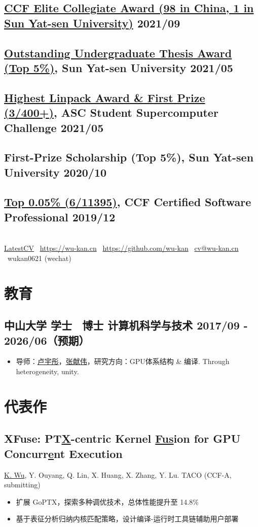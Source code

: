 \documentclass[
    scheme=plain
]{ctexart}
\makeatletter
\newcommand{\datedsubsection}[2]{%
\subsection[#1]{#1 \hfill #2}
}
\renewcommand\maketitle{
\begin{center}
  {\LARGE\textbf{\@title}}\\
  \href{https://resume.wu-kan.cn}{LatestCV}
  \textperiodcentered\
  \url{https://wu-kan.cn}
  \textperiodcentered\
  \url{https://github.com/wu-kan}
  \textperiodcentered\
  \href{mailto:cv@wu-kan.cn}{cv@wu-kan.cn}
  \textperiodcentered\
  {wukan0621 (wechat)}
\end{center}
}
\makeatother
\begin{document}
\datedsubsection{\href{https://mp.weixin.qq.com/s/AJKqG2KvLl6n_88_8IzsYw}{CCF Elite Collegiate Award (98 in China, 1 in Sun Yat-sen University)}}{2021/09}
\datedsubsection{\href{https://wu-kan.cn/21/03/14/HPL-AI/}{Outstanding Undergraduate Thesis Award (Top 5\%)}, Sun Yat-sen University}{2021/05}
\datedsubsection{\href{https://wu-kan.cn/21/05/19/\%E6\%88\%91\%E7\%9A\%84ASC\%E5\%86\%B3\%E8\%B5\%9B\%E5\%A4\%8D\%E7\%9B\%98-\%E5\%86\%92\%E9\%99\%A9-\%E5\%A4\%B1\%E8\%AF\%AF\%E4\%B8\%8E\%E7\%BF\%BB\%E8\%BD\%A6/}{Highest Linpack Award \& First Prize (3/400+)}, ASC Student Supercomputer Challenge}{2021/05}
\datedsubsection{First-Prize Scholarship (Top 5\%), Sun Yat-sen University}{2020/10}
\datedsubsection{\href{https://wu-kan.cn/2019/12/16/\%E7\%AC\%AC\%E5\%8D\%81\%E5\%85\%AB\%E6\%AC\%A1CCF\%E8\%AE\%A1\%E7\%AE\%97\%E6\%9C\%BA\%E8\%BD\%AF\%E4\%BB\%B6\%E8\%83\%BD\%E5\%8A\%9B\%E8\%AE\%A4\%E8\%AF\%81/}{Top 0.05\% (6/11395)}, CCF Certified Software Professional}{2019/12}

\newpage

\maketitle

\section{教育}

\datedsubsection{\textbf{中山大学} \quad 学士 \textperiodcentered\ 博士 \quad 计算机科学与技术}{2017/09 - 2026/06（预期）}

\begin{itemize}
  \item 导师：\href{https://cse.sysu.edu.cn/teacher/LuYutong}{卢宇彤}，\href{https://cse.sysu.edu.cn/teacher/ZhangXianwei}{张献伟}，研究方向：GPU体系结构 \& 编译. Through heterogeneity, unity.
\end{itemize}

\section{代表作}

\datedsubsection{\textbf{XFuse: PT\underline{X}-centric Kernel \underline{Fus}ion for GPU Concurr\underline{e}nt Execution}}{}

\underline{K. Wu}, Y. Ouyang, Q. Lin, X. Huang, X. Zhang, Y. Lu. TACO (CCF-A, submitting)

\begin{itemize}
    \item 扩展 GoPTX，探索多种调优技术，总体性能提升至 14.8\%
    \item 基于表征分析归纳内核匹配策略，设计编译-运行时工具链辅助用户部署
\end{itemize}
\end{document}
